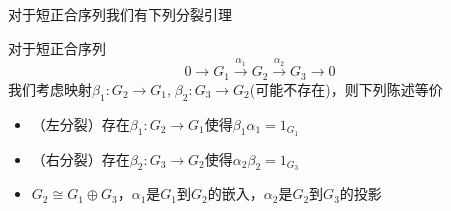 对于短正合序列我们有下列分裂引理
\begin{lemma}[分裂引理]
\label{fenlie}
对于短正合序列
\begin{equation*}
    0 \rightarrow G_{1}\xrightarrow{\alpha_{1}}G_{2}\xrightarrow{\alpha_{2}}G_{3}\rightarrow 0
\end{equation*}
我们考虑映射$\beta_{1}:G_{2}\rightarrow G_{1}$,$\;\beta_{2}:G_{3}\rightarrow G_{2}$(可能不存在)，则下列陈述等价
\begin{itemize}
    \item （左分裂）存在$\beta_{1}:G_{2}\rightarrow G_{1}$使得$\beta_{1}\alpha_{1}=1_{G_{1}}$
    \item （右分裂）存在$\beta_{2}:G_{3}\rightarrow G_{2}$使得$\alpha_{2}\beta_{2}=1_{G_{3}}$
    \item $G_{2}\cong G_{1}\oplus G_{3}$，$\alpha_{1}$是$G_{1}$到$G_{2}$的嵌入，$\alpha_{2}$是$G_{2}$到$G_{3}$的投影
\end{itemize}
\end{lemma}

